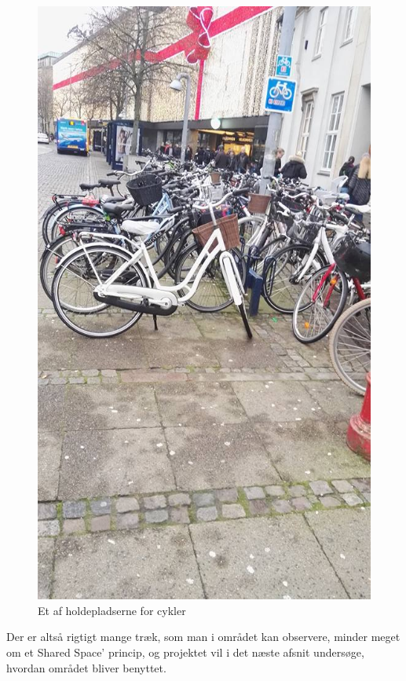 \begin{figure}[htbp]
   \centering
   \begin{adjustbox}{max width=\textwidth}
     \includegraphics[scale=0.5]{figures/Billederogfigur/cykelstativ.jpg}
  \end{adjustbox}
   \caption{Et af holdepladserne for cykler}
    \label{fig:cykelstativ}
 \end{figure}
Der er altså rigtigt mange træk, som man i området kan observere, minder meget om et Shared Space’ princip, og projektet vil i det næste afsnit undersøge, hvordan området bliver benyttet.


